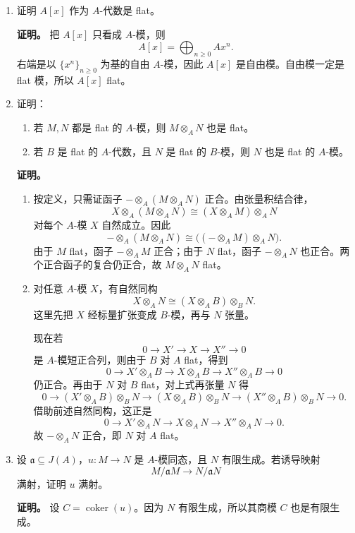 \documentclass[a4paper]{ctexart}
\begin{document}
\begin{enumerate}[leftmargin=*, label=\textbf{2.\arabic*.}]
\item 证明 \(A[x]\) 作为 \(A\)-代数是 flat。

\textbf{证明。}
把 \(A[x]\) 只看成 \(A\)-模，则
\[
A[x]=\bigoplus_{n\ge 0}Ax^n.
\]
右端是以 \(\{x^n\}_{n\ge 0}\) 为基的自由 \(A\)-模，因此 \(A[x]\) 是自由模。自由模一定是 flat 模，所以 \(A[x]\) flat。

\setcounter{enumi}{7}
\item 证明：
\begin{enumerate}[label=(\roman*)]
\item 若 \(M,N\) 都是 flat 的 \(A\)-模，则 \(M\otimes_A N\) 也是 flat。
\item 若 \(B\) 是 flat 的 \(A\)-代数，且 \(N\) 是 flat 的 \(B\)-模，则 \(N\) 也是 flat 的 \(A\)-模。
\end{enumerate}

\textbf{证明。}
\begin{enumerate}[label=(\roman*)]
\item 按定义，只需证函子 \(-\otimes_A(M\otimes_A N)\) 正合。由张量积结合律，
\[
X\otimes_A(M\otimes_A N)\cong (X\otimes_A M)\otimes_A N
\]
对每个 \(A\)-模 \(X\) 自然成立。因此
\[
-\otimes_A(M\otimes_A N)\cong \bigl((-\otimes_A M)\otimes_A N\bigr).
\]
由于 \(M\) flat，函子 \(-\otimes_A M\) 正合；由于 \(N\) flat，函子 \(-\otimes_A N\) 也正合。两个正合函子的复合仍正合，故 \(M\otimes_A N\) flat。

\item 对任意 \(A\)-模 \(X\)，有自然同构
\[
X\otimes_A N \cong (X\otimes_A B)\otimes_B N.
\]
这里先把 \(X\) 经标量扩张变成 \(B\)-模，再与 \(N\) 张量。

现在若
\[
0\to X'\to X\to X''\to 0
\]
是 \(A\)-模短正合列，则由于 \(B\) 对 \(A\) flat，得到
\[
0\to X'\otimes_A B\to X\otimes_A B\to X''\otimes_A B\to 0
\]
仍正合。再由于 \(N\) 对 \(B\) flat，对上式再张量 \(N\) 得
\[
0\to (X'\otimes_A B)\otimes_B N
\to (X\otimes_A B)\otimes_B N
\to (X''\otimes_A B)\otimes_B N
\to 0.
\]
借助前述自然同构，这正是
\[
0\to X'\otimes_A N\to X\otimes_A N\to X''\otimes_A N\to 0.
\]
故 \(-\otimes_A N\) 正合，即 \(N\) 对 \(A\) flat。
\end{enumerate}

\setcounter{enumi}{9}
\item 设 \(\mathfrak a\subseteq J(A)\)，\(u:M\to N\) 是 \(A\)-模同态，且 \(N\) 有限生成。若诱导映射
\[
M/\mathfrak aM\to N/\mathfrak aN
\]
满射，证明 \(u\) 满射。

\textbf{证明。}
设 \(C=\operatorname{coker}(u)\)。因为 \(N\) 有限生成，所以其商模 \(C\) 也是有限生成。


\end{enumerate}
\end{document}
